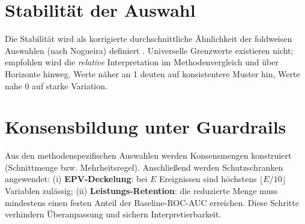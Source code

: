 \section{Stabilität der Auswahl}
Die Stabilität wird als korrigierte durchschnittliche Ähnlichkeit der foldweisen Auswahlen (nach Nogueira) definiert \parencite{nogueira2018stability}. Universelle Grenzwerte existieren nicht; empfohlen wird die \emph{relative} Interpretation im Methodenvergleich und über Horizonte hinweg. Werte näher an 1 deuten auf konsistentere Muster hin, Werte nahe 0 auf starke Variation.

\section{Konsensbildung unter Guardrails}
Aus den methodenspezifischen Auswahlen werden Konsensmengen konstruiert (Schnittmenge bzw. Mehrheitsregel). Anschließend werden Schutzschranken angewendet: (i) \textbf{EPV-Deckelung}: bei $E$ Ereignissen sind höchstens $\lfloor E/10 \rfloor$ Variablen zulässig; (ii) \textbf{Leistungs-Retention}: die reduzierte Menge muss mindestens einen festen Anteil der Baseline-ROC-AUC erreichen. Diese Schritte verhindern Überanpassung und sichern Interpretierbarkeit.

